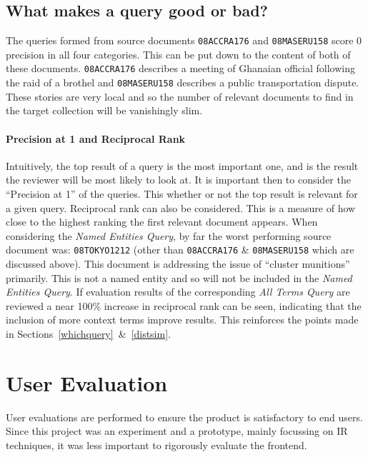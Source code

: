 \documentclass{l4proj}
\newcommand{\code}[1]{\texttt{#1}}
\begin{document}
\subsection{What makes a query good or bad?}
The queries formed from source documents \code{08ACCRA176} and \code{08MASERU158} score 0 precision in all four categories. This can be put down to the content of both of these documents. \code{08ACCRA176} describes a meeting of Ghanaian official following the raid of a brothel and \code{08MASERU158} describes a public transportation dispute. These stories are very local and so the number of relevant documents to find in the target collection will be vanishingly slim. \\
\paragraph{Precision at 1 and Reciprocal Rank}
Intuitively, the top result of a query is the most important one, and is the result the reviewer will be most likely to look at. It is important then to consider the ``Precision at 1'' of the queries. This whether or not the top result is relevant for a given query.
Reciprocal rank can also be considered. This is a measure of how close to the highest ranking the first relevant document appears. When considering the \textit{Named Entities Query}, by far the worst performing source document was: \code{08TOKYO1212} (other than \code{08ACCRA176} \& \code{08MASERU158} which are discussed above). This document is addressing the issue of ``cluster munitions'' primarily. This is not a named entity and so will not be included in the \textit{Named Entities Query}. If evaluation results of the corresponding \textit{All Terms Query} are reviewed a near 100\% increase in reciprocal rank can be seen, indicating that the inclusion of more context terms improve results. This reinforces the points made in Sections~\ref{whichquery}~\&~\ref{distsim}.

\section{User Evaluation} \label{userevaluation}
User evaluations are performed to ensure the product is satisfactory to end users. Since this project was an experiment and a prototype, mainly focussing on IR techniques, it was less important to rigorously evaluate the frontend.
\end{document}
